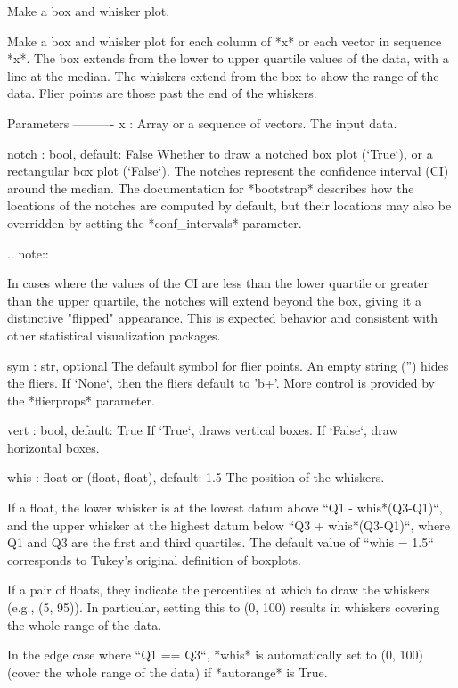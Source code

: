 \begin{DoxyVerb}Make a box and whisker plot.

Make a box and whisker plot for each column of *x* or each
vector in sequence *x*.  The box extends from the lower to
upper quartile values of the data, with a line at the median.
The whiskers extend from the box to show the range of the
data.  Flier points are those past the end of the whiskers.

Parameters
----------
x : Array or a sequence of vectors.
    The input data.

notch : bool, default: False
    Whether to draw a notched box plot (`True`), or a rectangular box
    plot (`False`).  The notches represent the confidence interval (CI)
    around the median.  The documentation for *bootstrap* describes how
    the locations of the notches are computed by default, but their
    locations may also be overridden by setting the *conf_intervals*
    parameter.

    .. note::

In cases where the values of the CI are less than the
lower quartile or greater than the upper quartile, the
notches will extend beyond the box, giving it a
distinctive "flipped" appearance. This is expected
behavior and consistent with other statistical
visualization packages.

sym : str, optional
    The default symbol for flier points.  An empty string ('') hides
    the fliers.  If `None`, then the fliers default to 'b+'.  More
    control is provided by the *flierprops* parameter.

vert : bool, default: True
    If `True`, draws vertical boxes.
    If `False`, draw horizontal boxes.

whis : float or (float, float), default: 1.5
    The position of the whiskers.

    If a float, the lower whisker is at the lowest datum above
    ``Q1 - whis*(Q3-Q1)``, and the upper whisker at the highest datum
    below ``Q3 + whis*(Q3-Q1)``, where Q1 and Q3 are the first and
    third quartiles.  The default value of ``whis = 1.5`` corresponds
    to Tukey's original definition of boxplots.

    If a pair of floats, they indicate the percentiles at which to
    draw the whiskers (e.g., (5, 95)).  In particular, setting this to
    (0, 100) results in whiskers covering the whole range of the data.

    In the edge case where ``Q1 == Q3``, *whis* is automatically set
    to (0, 100) (cover the whole range of the data) if *autorange* is
    True.


\end{DoxyVerb}
